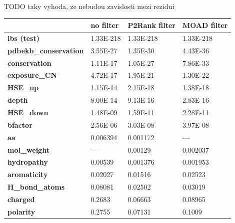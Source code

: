 TODO taky vyhoda, ze nebudou zavislosti mezi rezidui

\begin{table}[!htbp]
\centering
\begin{tabular}{llll}
\hline
                              & \textbf{no filter} & \textbf{P2Rank filter} & \textbf{MOAD filter} \\ \hline
\textbf{lbs (test)}                  & 1.33E-218          & 1.33E-218              & 1.33E-218            \\
\textbf{pdbekb\_conservation} & 3.55E-27           & 1.35E-30               & 4.43E-36             \\
\textbf{conservation}         & 1.11E-17           & 1.05E-27               & 7.86E-33             \\
\textbf{exposure\_CN}         & 4.72E-17           & 1.95E-21               & 1.30E-22             \\
\textbf{HSE\_up}              & 1.15E-14           & 2.15E-18               & 1.38E-18             \\
\textbf{depth}                & 8.00E-14           & 9.13E-16               & 2.83E-16             \\
\textbf{HSE\_down}            & 1.48E-09           & 1.59E-11               & 2.28E-11             \\
\textbf{bfactor}              & 2.56E-06           & 3.03E-08               & 3.97E-08             \\
\textbf{aa}                   & 0.006394           & 0.001172               & ---                  \\
\textbf{mol\_weight}          & ---                & 0.00129                & 0.002037             \\
\textbf{hydropathy}           & 0.00539            & 0.001376               & 0.001953             \\
\textbf{aromaticity}          & 0.02027            & 0.01516                & 0.02523              \\
\textbf{H\_bond\_atoms}       & 0.08081            & 0.02502                & 0.03019              \\
\textbf{charged}              & 0.2683             & 0.06663                & 0.08965              \\
\textbf{polarity}             & 0.2755             & 0.07131                & 0.1009               \\

\end{tabular}
\end{table}
